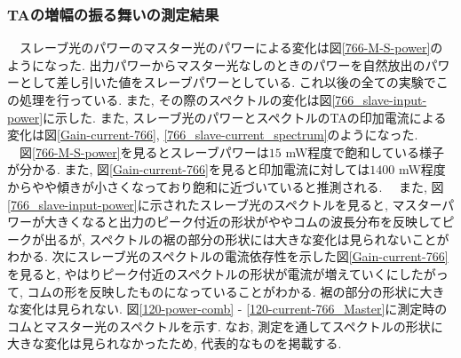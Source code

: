 \documentclass[uplatex, dvipdfmx, a4paper, report, papersize, 11pt]{jsbook}
\begin{document}
\subsubsection{TAの増幅の振る舞いの測定結果}
　スレーブ光のパワーのマスター光のパワーによる変化は図\ref{766-M-S-power}のようになった. 出力パワーからマスター光なしのときのパワーを自然放出のパワーとして差し引いた値をスレーブパワーとしている. これ以後の全ての実験でこの処理を行っている. また, その際のスペクトルの変化は図\ref{766_slave-input-power}に示した. また, スレーブ光のパワーとスペクトルのTAの印加電流による変化は図\ref{Gain-current-766}, \ref{766_slave-current_spectrum}のようになった. \\
　図\ref{766-M-S-power}を見るとスレーブパワーは$15$ mW程度で飽和している様子が分かる. また, 図\ref{Gain-current-766}を見ると印加電流に対しては$1400$ mW程度からやや傾きが小さくなっており飽和に近づいていると推測される.
　また, 図\ref{766_slave-input-power}に示されたスレーブ光のスペクトルを見ると, マスターパワーが大きくなると出力のピーク付近の形状がややコムの波長分布を反映してピークが出るが, スペクトルの裾の部分の形状には大きな変化は見られないことがわかる. 次にスレーブ光のスペクトルの電流依存性を示した図\ref{Gain-current-766}を見ると, やはりピーク付近のスペクトルの形状が電流が増えていくにしたがって, コムの形を反映したものになっていることがわかる. 裾の部分の形状に大きな変化は見られない. 図\ref{120-power-comb} - \ref{120-current-766_Master}に測定時のコムとマスター光のスペクトルを示す. なお, 測定を通してスペクトルの形状に大きな変化は見られなかったため, 代表的なものを掲載する.
\newpage
\end{document}
